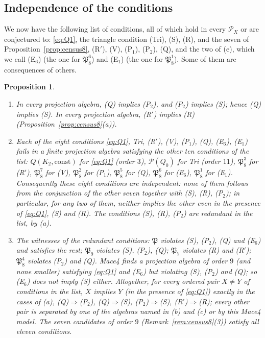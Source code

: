 \documentclass[11pt]{amsart}
\newtheorem{proposition}[theorem]{Proposition}
\theoremstyle{definition}
\renewcommand{\P}{\mathcal{P}}
\begin{document}
\subsection{Independence of the conditions}\label{subsec:indep}

We now have the following list of conditions, all of which hold in every $\P_X$ or are conjectured to: \eqref{eq:Q1}, the triangle condition (Tri), (S), (R), and the seven of Proposition~\ref{prop:census8}, (R$'$), (V), (P$_1$), (P$_2$), (Q), and the two of (e), which we call (E$_6$) (the one for $\mathfrak P_8^6$) and (E$_1$) (the one for $\mathfrak P_8^1$). Some of them are consequences of others.

\begin{proposition}\label{prop:indep}
\begin{enumerate}[label=\textup{(\alph*)},nosep]
\item In every projection algebra, (Q) implies (P$_2$), and (P$_2$) implies (S); hence (Q) implies (S). In every projection algebra, (R$'$) implies (R) (Proposition~\ref{prop:census8}(a)).
\item Each of the eight conditions \eqref{eq:Q1}, Tri, (R$'$), (V), (P$_1$), (Q), (E$_6$), (E$_1$) fails in a finite projection algebra satisfying the other ten conditions of the list: $Q(K_2,\mathrm{const})$ for \eqref{eq:Q1} (order $3$), $\P(Q_0)$ for Tri (order $11$), $\mathfrak P_8^3$ for (R$'$), $\mathfrak P_8^7$ for (V), $\mathfrak P_8^2$ for (P$_1$), $\mathfrak P_8^5$ for (Q), $\mathfrak P_8^6$ for (E$_6$), $\mathfrak P_8^1$ for (E$_1$). Consequently these eight conditions are independent: none of them follows from the conjunction of the other seven together with (S), (R), (P$_2$); in particular, for any two of them, neither implies the other even in the presence of \eqref{eq:Q1}, (S) and (R). The conditions (S), (R), (P$_2$) are redundant in the list, by (a).
\item The witnesses of the redundant conditions: $\mathfrak P$ violates (S), (P$_2$), (Q) and (E$_6$) and satisfies the rest; $\mathfrak P_9$ violates (S), (P$_2$), (Q); $\mathfrak P_7$ violates (R) and (R$'$); $\mathfrak P_8^4$ violates (P$_2$) and (Q). Mace4 finds a projection algebra of order $9$ (and none smaller) satisfying \eqref{eq:Q1} and (E$_6$) but violating (S), (P$_2$) and (Q); so (E$_6$) does not imply (S) either. Altogether, for every ordered pair $X\ne Y$ of conditions in the list, $X$ implies $Y$ (in the presence of \eqref{eq:Q1}) exactly in the cases of (a), (Q)$\Rightarrow$(P$_2$), (Q)$\Rightarrow$(S), (P$_2$)$\Rightarrow$(S), (R$'$)$\Rightarrow$(R); every other pair is separated by one of the algebras named in (b) and (c) or by this Mace4 model. The seven candidates of order $9$ (Remark~\ref{rem:census8}(3)) satisfy all eleven conditions.
\end{enumerate}
\end{proposition}
\end{document}
